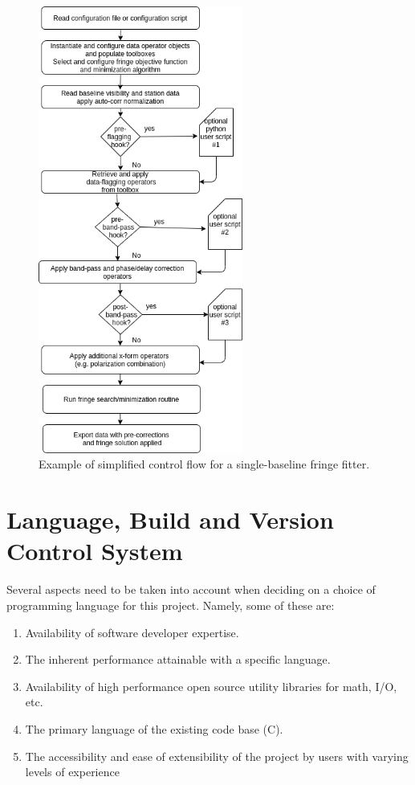 \documentclass[hidelinks]{article}
\let\Oldsection\section
\renewcommand{\section}{\FloatBarrier\Oldsection}
\begin{document}
\begin{figure}[h!]
\begin{center}
  \includegraphics[width=0.6\textwidth]{example-single-baseline-fringe-fitter.png}
    \caption{Example of simplified control flow for a single-baseline fringe fitter.}
    \label{fig:fringe-fitter}
\end{center}
\end{figure}



\section{Language, Build and Version Control System}

Several aspects need to be taken into account when deciding on a choice of programming language for this project. Namely, some of these are:
\begin{enumerate}
 \item Availability of software developer expertise.
 \item The inherent performance attainable with a specific language.
 \item Availability of high performance open source utility libraries for math, I/O, etc.
 \item The primary language of the existing code base (C).
 \item The accessibility and ease of extensibility of the project by users with varying levels of experience
\end{enumerate}
\end{document}
